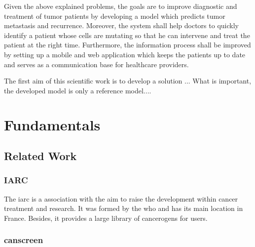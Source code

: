 Given the above explained problems, the goals are to improve diagnostic and treatment of tumor patients by developing a model which predicts tumor metastasis and recurrence. Moreover, the system shall help doctors to quickly identify a patient whose cells are mutating so that he can intervene and treat the patient at the right time. Furthermore, the information process shall be improved by setting up a mobile and web application which keeps the patients up to date and serves as a communication base for healthcare providers.

The first aim of this scientific work is to develop a solution ...
What is important, the developed model is only a reference model....

\chapter{Fundamentals}\label{fundamentals}

\section{Related Work}

\subsection{\ac{IARC}}

The \ac{iarc} is a association with the aim to raise the development within cancer treatment and research. It was formed by the \ac{who} and has its main location in France. Besides, it provides a large library of cancerogens for users.



\subsection{canscreen}


